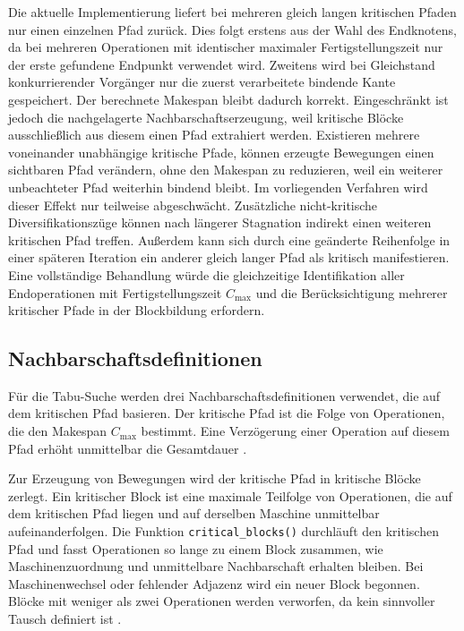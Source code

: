 Die aktuelle Implementierung liefert bei mehreren gleich langen kritischen Pfaden nur einen einzelnen Pfad zurück.
Dies folgt erstens aus der Wahl des Endknotens, da bei mehreren Operationen mit identischer maximaler Fertigstellungszeit nur der erste gefundene Endpunkt verwendet wird.
Zweitens wird bei Gleichstand konkurrierender Vorgänger nur die zuerst verarbeitete bindende Kante gespeichert.
Der berechnete Makespan bleibt dadurch korrekt.
Eingeschränkt ist jedoch die nachgelagerte Nachbarschaftserzeugung, weil kritische Blöcke ausschließlich aus diesem einen Pfad extrahiert werden.
Existieren mehrere voneinander unabhängige kritische Pfade, können erzeugte Bewegungen einen sichtbaren Pfad verändern, ohne den Makespan zu reduzieren, weil ein weiterer unbeachteter Pfad weiterhin bindend bleibt.
Im vorliegenden Verfahren wird dieser Effekt nur teilweise abgeschwächt.
Zusätzliche nicht-kritische Diversifikationszüge können nach längerer Stagnation indirekt einen weiteren kritischen Pfad treffen.
Außerdem kann sich durch eine geänderte Reihenfolge in einer späteren Iteration ein anderer gleich langer Pfad als kritisch manifestieren.
Eine vollständige Behandlung würde die gleichzeitige Identifikation aller Endoperationen mit Fertigstellungszeit $C_{\max}$ und die Berücksichtigung mehrerer kritischer Pfade in der Blockbildung erfordern.


\subsection{Nachbarschaftsdefinitionen}
\label{sec:nachbarschaftsdefinitionen}
Für die Tabu-Suche werden drei Nachbarschaftsdefinitionen verwendet, die auf dem kritischen Pfad basieren.
Der kritische Pfad ist die Folge von Operationen, die den Makespan $C_{\max}$ bestimmt.
Eine Verzögerung einer Operation auf diesem Pfad erhöht unmittelbar die Gesamtdauer \cite{blazewicz_handbook_2019}.


Zur Erzeugung von Bewegungen wird der kritische Pfad in kritische Blöcke zerlegt.
Ein kritischer Block ist eine maximale Teilfolge von Operationen, die auf dem kritischen Pfad liegen und auf derselben Maschine unmittelbar aufeinanderfolgen.
Die Funktion \texttt{critical\_blocks()} durchläuft den kritischen Pfad und fasst Operationen so lange zu einem Block zusammen, wie Maschinenzuordnung und unmittelbare Nachbarschaft erhalten bleiben.
Bei Maschinenwechsel oder fehlender Adjazenz wird ein neuer Block begonnen.
Blöcke mit weniger als zwei Operationen werden verworfen, da kein sinnvoller Tausch definiert ist \cite{nowicki_fast_1996}.


